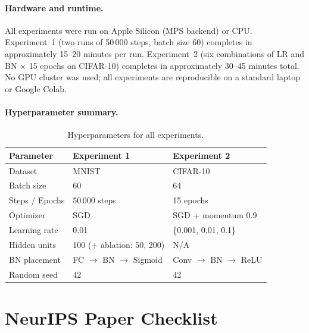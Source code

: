 \documentclass{article}
\begin{document}
\paragraph{Hardware and runtime.}
All experiments were run on Apple Silicon (MPS backend) or CPU. Experiment~1 (two runs of
50\,000 steps, batch size 60) completes in approximately 15--20 minutes per run. Experiment~2
(six combinations of LR and BN $\times$ 15 epochs on CIFAR-10) completes in approximately
30--45 minutes total. No GPU cluster was used; all experiments are reproducible on a standard
laptop or Google Colab.

\paragraph{Hyperparameter summary.}

\begin{table}[h]
  \caption{Hyperparameters for all experiments.}
  \centering
  \begin{tabular}{lll}
    \toprule
    Parameter & Experiment 1 & Experiment 2 \\
    \midrule
    Dataset         & MNIST         & CIFAR-10 \\
    Batch size      & 60            & 64 \\
    Steps / Epochs  & 50\,000 steps & 15 epochs \\
    Optimizer       & SGD           & SGD + momentum 0.9 \\
    Learning rate   & 0.01          & \{0.001, 0.01, 0.1\} \\
    Hidden units    & 100 (+ ablation: 50, 200) & N/A \\
    BN placement    & FC $\to$ BN $\to$ Sigmoid & Conv $\to$ BN $\to$ ReLU \\
    Random seed     & 42            & 42 \\
    \bottomrule
  \end{tabular}
\end{table}


\newpage
\section*{NeurIPS Paper Checklist}
\end{document}
